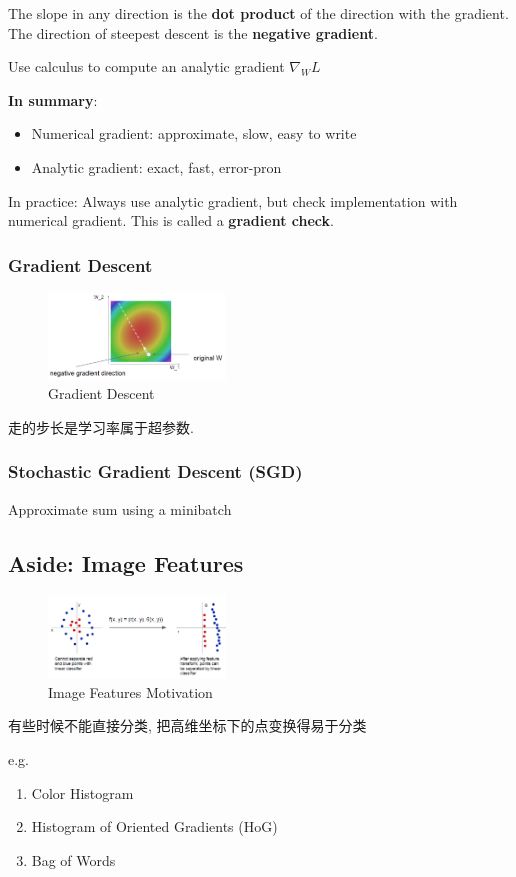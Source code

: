 The slope in any direction is the \textbf{dot product} of the direction with the gradient.  The direction of steepest descent is the \textbf{negative gradient}. 

Use calculus to compute an analytic gradient $\nabla_W L$

\textbf{In summary}:
\begin{itemize}\small
    \item Numerical gradient: approximate, slow, easy to write
    \item Analytic gradient: exact, fast, error-pron
\end{itemize}

In practice: Always use analytic gradient, but check implementation with numerical gradient. This is called a \textbf{gradient check}.


\subsubsection{Gradient Descent}

\begin{figure}[!htb]
    \centering
    \includegraphics[width=0.42\textwidth]{pic/Lec3/Gradient Descent.png}
    \caption{Gradient Descent}
\end{figure}

走的步长是学习率属于超参数. 

\subsubsection{Stochastic Gradient Descent (SGD)}
Approximate sum using a minibatch


\subsection{Aside: Image Features}
\begin{figure}[!htb]
    \centering
    \includegraphics[width=0.42\textwidth]{pic/Lec3/Motivation}
    \caption{Image Features Motivation}
\end{figure}
有些时候不能直接分类, 把高维坐标下的点变换得易于分类

e.g. 
\begin{enumerate}
    \item Color Histogram
    \item Histogram of Oriented Gradients (HoG)
    \item Bag of Words
\end{enumerate}



